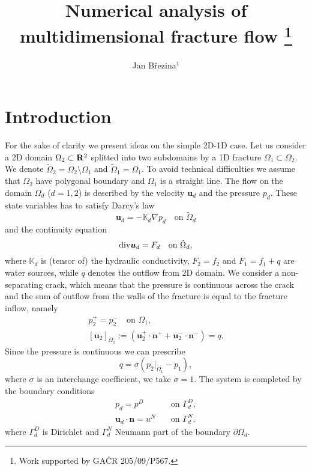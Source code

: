 \documentclass{Mamern09}
\title{Numerical analysis of multidimensional fracture flow
\footnote{Work supported by GA\v CR 205/09/P567.}}
\author{Jan B\v rezina$^1$}
\def\div{{\rm div}}
\def\grad{\nabla}
\def\Real{{\rm\bf R}}
\def\vc#1{\mathbf{\boldsymbol{#1}}}     %
\def\tn#1{{\mathbb{#1}}}    %
\def\prtl{\partial}                                        %
\begin{document}
\def\vl{{\vc{u}}}
\section{Introduction}
For the sake of clarity we present ideas on the simple 2D-1D case. Let us consider a 2D domain $\Omega_2\subset \Real^2$
splitted into two subdomains by a 1D fracture $\Omega_1\subset\Omega_2$.
We denote $ \tilde\Omega_2=\Omega_2\setminus\Omega_1$ and $\tilde\Omega_1=\Omega_1$.
To avoid technical difficulties we assume that $\Omega_2$ have polygonal boundary and $\Omega_1$ is a straight line. The flow on the domain $\Omega_d$ ($d=1,2$) is described by the velocity $\vl_d$ and the pressure
$p_d$. These state variables has to satisfy Darcy's law
\begin{equation}\label{Darcy}
 	\vl_d=-\tn K_d \grad p_d \quad \text{on }\tilde \Omega_d
\end{equation}
and the continuity equation
\begin{equation}\label{RC}
 	\div \vl_d = F_d	\quad \text{on }\tilde \Omega_d,
\end{equation}
where $\tn K_d$ is (tensor of) the hydraulic conductivity, $F_2=f_2$ and $F_1=f_1+q$
are water sources, while $q$ denotes the outflow from 2D domain. We consider a non-separating crack, which means that the pressure is continuous across the crack and the sum of outflow from the walls of the fracture is equal to the fracture inflow,
namely  
\begin{gather*}
 	p_2^{+} = p_2^{-}\quad \text{on }\Omega_1,\\
 	[\vl_2]_{\Omega_1}:= (\vc \vl_2^{+}\cdot\vc n^{+} + \vc u_2^{-}\cdot\vc n^{-}) = q.
\end{gather*}
Since the pressure is continuous we can prescribe
\[
 q=\sigma(p_2|_{\Omega_1} - p_1),
\]
where $\sigma$ is an interchange coefficient, we take $\sigma=1$. The system is completed by the boundary conditions
\begin{align*}
        p_d = p^D&\quad \text{on }\Gamma_d^D,\\
        \vl_d\cdot\vc n= u^N&\quad \text{on }\Gamma_d^N.
\end{align*}
where $\Gamma_d^D$ is Dirichlet and $\Gamma_d^N$ Neumann part of the boundary $\prtl\Omega_d$.
\end{document}
